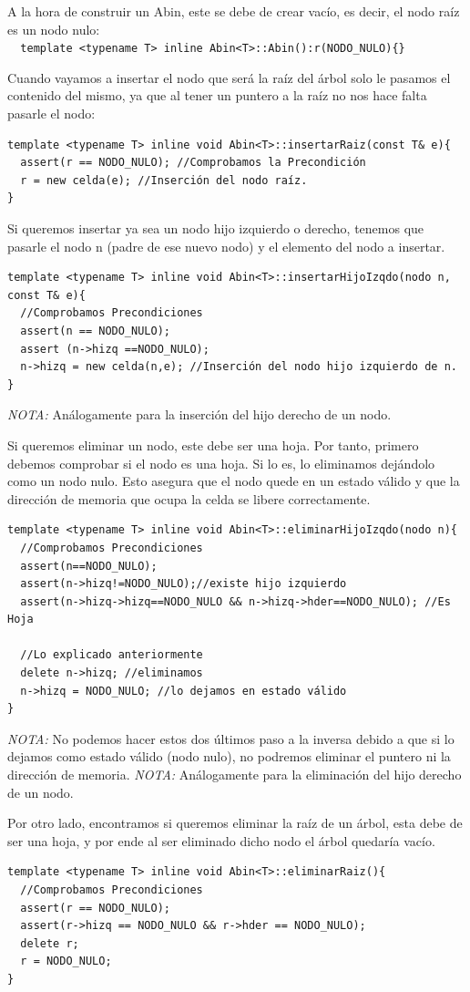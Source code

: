 A la hora de construir un Abin, este se debe de crear vacío, es decir, el nodo raíz es un nodo nulo:\\
\verb|  template <typename T> inline Abin<T>::Abin():r(NODO_NULO){}|

Cuando vayamos a insertar el nodo que será la raíz del árbol solo le pasamos el contenido del mismo, ya que al tener un puntero a la raíz no nos hace falta pasarle el nodo:
\begin{verbatim}
template <typename T> inline void Abin<T>::insertarRaiz(const T& e){
  assert(r == NODO_NULO); //Comprobamos la Precondición
  r = new celda(e); //Inserción del nodo raíz.
}
\end{verbatim}

Si queremos insertar ya sea un nodo hijo izquierdo o derecho, tenemos que pasarle el nodo n (padre de ese nuevo nodo) y el elemento del nodo a insertar.
\begin{verbatim}
template <typename T> inline void Abin<T>::insertarHijoIzqdo(nodo n, const T& e){
  //Comprobamos Precondiciones
  assert(n == NODO_NULO); 
  assert (n->hizq ==NODO_NULO);
  n->hizq = new celda(n,e); //Inserción del nodo hijo izquierdo de n.
}
\end{verbatim}
\textit{NOTA:} Análogamente para la inserción del hijo derecho de un nodo.

Si queremos eliminar un nodo, este debe ser una hoja. Por tanto, primero debemos comprobar si el nodo es una hoja. Si lo es, lo eliminamos dejándolo como un nodo nulo. Esto asegura que el nodo quede en un estado válido y que la dirección de memoria que ocupa la celda se libere correctamente.
\begin{verbatim}
template <typename T> inline void Abin<T>::eliminarHijoIzqdo(nodo n){
  //Comprobamos Precondiciones
  assert(n==NODO_NULO);
  assert(n->hizq!=NODO_NULO);//existe hijo izquierdo
  assert(n->hizq->hizq==NODO_NULO && n->hizq->hder==NODO_NULO); //Es Hoja

  //Lo explicado anteriormente
  delete n->hizq; //eliminamos
  n->hizq = NODO_NULO; //lo dejamos en estado válido
}
\end{verbatim}
\textit{NOTA:} No podemos hacer estos dos últimos paso a la inversa debido a que si lo dejamos como estado válido (nodo nulo), no podremos eliminar el puntero ni la dirección de memoria.
\textit{NOTA:} Análogamente para la eliminación del hijo derecho de un nodo.

Por otro lado, encontramos si queremos eliminar la raíz de un árbol, esta debe de ser una hoja, y por ende al ser eliminado dicho nodo el árbol quedaría vacío.
\begin{verbatim}
template <typename T> inline void Abin<T>::eliminarRaiz(){
  //Comprobamos Precondiciones
  assert(r == NODO_NULO);
  assert(r->hizq == NODO_NULO && r->hder == NODO_NULO);
  delete r;
  r = NODO_NULO;
}
\end{verbatim}

